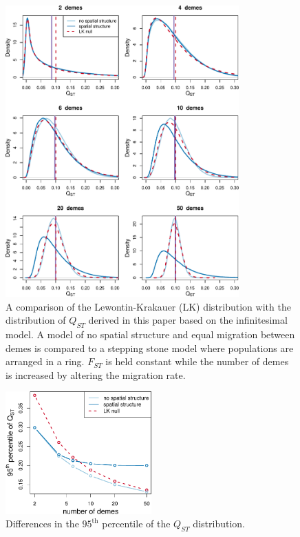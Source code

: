 \begin{figure}
  \centering
  \includegraphics[width=0.8\textwidth]{figures/qst_deme_compare.pdf}
  \caption{A comparison of the Lewontin-Krakauer (LK) distribution with the
    distribution of $Q_{ST}$ derived in this paper based on the infinitesimal
    model. A model of no spatial structure and equal migration between demes is
    compared to a stepping stone model where populations are arranged in a ring.
    $F_{ST}$ is held constant while the number of demes is increased by altering
    the migration rate.}
  \label{fig:qst_deme}
\end{figure}
\begin{figure}
  \centering
  \includegraphics[width=0.5\textwidth]{figures/qst_deme_percentile_nospace.pdf}
  \caption{Differences in the $95^{\mathrm{th}}$ percentile of the $Q_{ST}$
    distribution.}
  \label{fig:qst_perc}
\end{figure}
